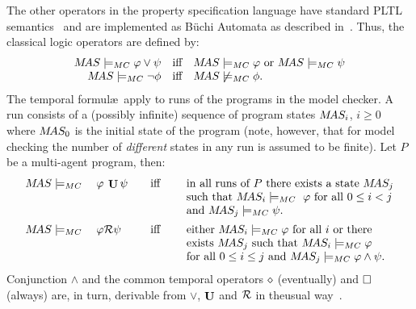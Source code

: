 \noindent The other operators in the \ajpf{} property specification
language have standard PLTL semantics~\cite{emerson:90a} and are
implemented as B\"{u}chi Automata as described
in~\cite{Gerth:1995:SOA:645837.670574,Courcoubetis92mea}. Thus, the
classical logic operators are defined by:
$$
\begin{array}{rcl}
  M\!AS \models_{MC} \varphi \vee \psi &\text{iff}& M\!AS \models_{MC}
  \varphi \text{ or } M\!AS \models_{MC} \psi \\
  M\!AS \models_{MC} \neg \phi &\text{iff}& M\!AS \not\models_{MC} \phi.
\end{array}
$$
The temporal formul\ae\ apply to runs of the programs in the \jpf{}
model checker. A run consists of a (possibly infinite) sequence of
program states $M\!AS_i$, $i \geq 0$ where $M\!AS_0$ is the initial
state of the program (note, however, that for model checking the
number of \emph{different} states in any run is assumed to be
finite). Let $P$ be a multi-agent program, then:
$$
\begin{array}{lcl}
  \MAS \models_{MC}\quad \varphi \: \luntil \psi 
   &\quad\text{iff}\quad&
    \text{ in all runs of $P$ there exists a state } \MAS_j\\
  &&  \text{ such that } \MAS_i \models_{MC}\ \varphi \text{ for all } 0 \leq i < j \\
  && \text{ and } \MAS_j \models_{MC} \psi{}.\\[.5em]
%
  \MAS \models_{MC}\quad\varphi \release \psi  
   &\quad\text{iff}\quad&
    \text{ either } \MAS_i \models_{MC} \varphi \text{ for all } i \text{ or there }\\
  && \text{ exists } \MAS_j \text{ such  that } \MAS_i \models_{MC} \varphi\\
  && \text{ for all } 0 \leq i \leq j \text{ and } \MAS_j \models_{MC} \varphi \land \psi{}.
\end{array}
$$
%
Conjunction $\land$ and the common temporal operators $\diamond$ (eventually) and $\Box$
(always) are, in turn, derivable from $\vee$, $\mathop{\mathrm{\mathbf{U}}}$ and $\mathcal{R}$ in theusual way~\cite{emerson:90a}.

